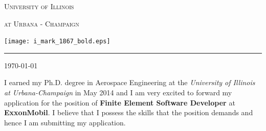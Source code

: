 \documentclass[11pt]{article}
\newcommand{\company}{\textbf{ExxonMobil}}
\newcommand{\position}{\textbf{Finite Element Software Developer }}
\begin{document}
\thispagestyle{empty}
\vspace*{-1.6truein}
\hspace*{1.85truein}
\centerline{\LARGE\textsc{University of Illinois}}
\hspace*{1.85truein}
\centerline{\Large\textsc{at Urbana - Champaign}}
%
%
\begin{minipage}[t]{0.45\textwidth}
\vspace{-0.75truein}
\end{minipage} 


\hspace*{1.45truein}
\begin{minipage}[t]{0.30\textwidth}
\vspace*{-1.0truein}
\hfill\texttt{[image: i\_mark\_1867\_bold.eps]}
\par\vspace*{0pt}
\end{minipage} 

%
%
\vspace{-0.35truein}
\rule[0.8em]{\textwidth}{1.0pt} 

\noindent
\begin{minipage}[b]{0.7\textwidth}
\vspace{-0.35truein}
\noindent
\small
\begin{tabbing}
\end{tabbing}
\vspace{0pt}
\end{minipage} \hfill
\begin{minipage}[b]{0.7\textwidth}
\vspace{-12pt}
\noindent
\begin{tabbing}
\today 
\end{tabbing}
\vspace{0pt}
\end{minipage} 
%
%




I earned my Ph.D. degree in Aerospace Engineering at the \emph{University of Illinois at Urbana-Champaign} in May 2014 and I am very excited to forward my application for the position of \position at \company.    I believe that I possess the skills that the position demands and hence I am submitting my application.  
\end{document}
